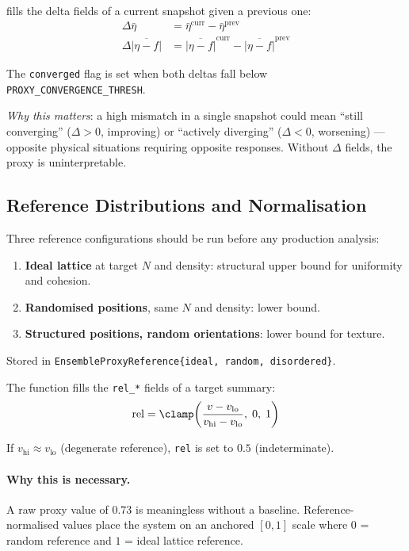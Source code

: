 \documentclass[11pt]{article}
\newcommand{\type}[1]{\texttt{#1}}
\begin{document}
 fills the delta fields of a
current snapshot given a previous one:
\begin{align}
  \Delta\bar\eta &= \bar\eta^\text{curr} - \bar\eta^\text{prev} \\
  \Delta\overline{|\eta-f|} &= \overline{|\eta-f|}^\text{curr}
    - \overline{|\eta-f|}^\text{prev}
\end{align}

The \texttt{converged} flag is set when both deltas fall below
\texttt{PROXY\_CONVERGENCE\_THRESH}.

\textit{Why this matters}: a high mismatch in a single snapshot could mean
``still converging'' ($\Delta > 0$, improving) or ``actively diverging''
($\Delta < 0$, worsening) --- opposite physical situations requiring
opposite responses.  Without $\Delta$ fields, the proxy is uninterpretable.

\subsection{Reference Distributions and Normalisation}

Three reference configurations should be run before any production analysis:
\begin{enumerate}
  \item \textbf{Ideal lattice} at target $N$ and density: structural upper
        bound for uniformity and cohesion.
  \item \textbf{Randomised positions}, same $N$ and density: lower bound.
  \item \textbf{Structured positions, random orientations}: lower bound for
        texture.
\end{enumerate}

Stored in \type{EnsembleProxyReference\{ideal, random, disordered\}}.

The function  fills the \texttt{rel\_*}
fields of a target summary:
\begin{equation}
  \text{rel} = \clamp\!\left(
    \frac{v - v_\text{lo}}{v_\text{hi} - v_\text{lo}},\; 0,\; 1\right)
\end{equation}

If $v_\text{hi} \approx v_\text{lo}$ (degenerate reference), \texttt{rel}
is set to $0.5$ (indeterminate).

\paragraph{Why this is necessary.}
A raw proxy value of $0.73$ is meaningless without a baseline.
Reference-normalised values place the system on an anchored $[0, 1]$
scale where $0$ = random reference and $1$ = ideal lattice reference.
\end{document}
